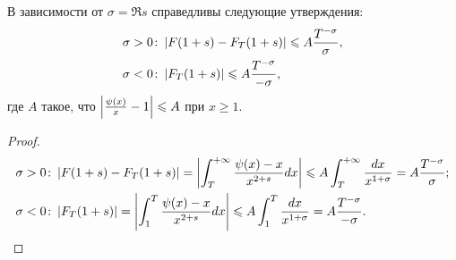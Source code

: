 \begin{nlemma}
\label{lm:I-13}
    В зависимости от $\sigma = \Re{s}$ справедливы следующие утверждения:
    \begin{align*}
        \sigma > 0\colon & \left| F(1+s) - F_T(1+s) \right| \leqslant A\frac{T^{-\sigma}}{\sigma}, \\
        \sigma < 0\colon & \left| F_T(1+s) \right| \leqslant A\frac{T^{-\sigma}}{-\sigma},
    \end{align*}
    где $A$ такое, что $\left| \frac{\psi(x)}{x} - 1 \right| \leqslant A$ при $x \ge 1$.
\end{nlemma}
\begin{proof}
    \begin{align*}
        \sigma > 0\colon& \left| F(1+s) - F_T(1+s) \right| 
          = \left| \int_T^{+\infty}\frac{\psi(x)-x}{x^{2+s}}dx \right| 
          \leqslant A\int_{T}^{+\infty}\frac{dx}{x^{1+\sigma}} 
          = A\frac{T^{-\sigma}}{\sigma};\\
        \sigma < 0\colon& \left| F_T(1+s) \right| 
          = \left| \int_1^T\frac{\psi(x)-x}{x^{2+s}}dx \right| 
          \leqslant A\int_1^T\frac{dx}{x^{1+\sigma}} 
          = A\frac{T^{-\sigma}}{-\sigma}.
    \end{align*}
\end{proof}
